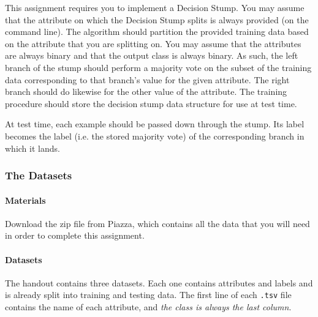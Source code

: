 \documentclass[11pt,addpoints,answers]{exam}
\numberwithin{equation}{section} %
\numberwithin{figure}{section} %
\numberwithin{table}{section} %
\begin{document}
This assignment requires you to implement a Decision Stump. You may assume that the attribute on which the Decision Stump splits is always provided (on the command line). The algorithm should partition the provided training data based on the attribute that you are splitting on. You may assume that the attributes are always binary and that the output class is always binary. As such, the left branch of the stump should perform a majority vote on the subset of the training data corresponding to that branch's value for the given attribute. The right branch should do likewise for the other value of the attribute. The training procedure should store the decision stump data structure for use at test time. 

At test time, each example should be passed down through the stump. Its label becomes the label (i.e. the stored majority vote) of the corresponding branch in which it lands. 

\subsubsection{The Datasets}
\label{sec:data}

\paragraph{Materials} Download the zip file from Piazza, which contains all the data that you will need in order to complete this assignment.

\paragraph{Datasets}

The handout contains three datasets. Each one contains attributes and labels and is already split into training and testing data. The first line of each \lstinline{.tsv} file contains the name of each attribute, and \emph{the class is always the last column}.
\end{document}
